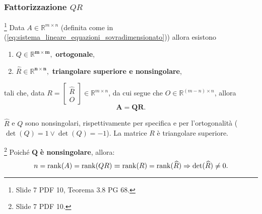 \subsubsection{Fattorizzazione \texorpdfstring{$QR$}{QR}}
\begin{theorem}\label{th:esistenza_fattorizzazione_QR}\footnote{Slide 7 PDF 10, Teorema 3.8 PG 68.}
    Data $A\in\mathbb R^{m\times n}$ (definita come in (\ref{eq:sistema_lineare_equazioni_sovradimensionato})) allora esistono
    \begin{enumerate}
        \item $Q\in\mathbb R^{\boldsymbol{m\times m}},$ \textbf{ortogonale},
        \item $\widehat R\in\mathbb R^{\boldsymbol{n\times n}},$ \textbf{triangolare superiore e nonsingolare},
    \end{enumerate}
    tali che, data $R =
    \begin{bmatrix}
        \widehat R\\
        O
    \end{bmatrix}\in \mathbb R^{m\times n}$, da cui segue che $O\in\mathbb R^{(m-n)\times n}$, allora
    \begin{equation}\label{eq:fattorizzazione_QR}
        \boldsymbol{A=QR.}
    \end{equation}
\end{theorem}

$\widehat R$ e $Q$ sono nonsingolari, rispettivamente per specifica e per l'ortogonalità ($\det(Q)=1\vee \det(Q)=-1$). La matrice $R$ è triangolare superiore.

\begin{remark}\label{rem:fattQRNonSing}\footnote{Slide 7 PDF 10.}
    Poiché $\boldsymbol Q$ \textbf{è \gls{nonsingolare}}, allora:
    \begin{equation*}
        n = \operatorname{rank}(A) = \operatorname{rank} (QR) \boldsymbol = \operatorname{rank}(R) = \operatorname{rank}(\widehat R)\Rightarrow \det(\widehat R)\neq 0.
    \end{equation*}
\end{remark}

